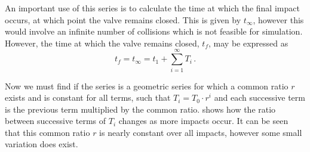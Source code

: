 An important use of this series is to calculate the time at which the final impact occurs, at which point the valve remains closed. This is given by $t_\infty$, however this would involve an infinite number of collisions which is not feasible for simulation. However, the time at which the valve remains closed, $t_f$, may be expressed as
~
\begin{equation*}
    t_f = t_\infty = t_1 + \sum^\infty_{i = 1} T_i \, .
\end{equation*}

Now we must find if the series is a geometric series for which a common ratio $r$ exists and is constant for all terms, such that $T_i = T_0 \cdot r^i$ and each successive term is the previous term multiplied by the common ratio.  shows how the ratio between successive terms of $T_i$ changes as more impacts occur. It can be seen that this common ratio $r$ is nearly constant over all impacts, however some small variation does exist.

